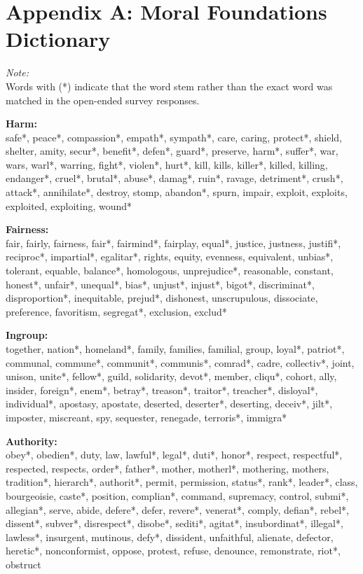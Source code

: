 \documentclass[12pt]{paper}
\begin{document}
\clearpage\flushleft\singlespace
\section*{Appendix A: Moral Foundations Dictionary \\\citep[c.f.][]{graham2009liberals}}

\textit{Note:}\\
Words with (*) indicate that the word stem rather than the exact word was matched in the open-ended survey responses.
\vspace{.5cm}

\textbf{Harm:}\\
safe*, peace*, compassion*, empath*, sympath*, care, caring, protect*, shield, shelter, amity, secur*, benefit*, defen*, guard*, preserve, harm*, suffer*, war, wars, warl*, warring, fight*, violen*, hurt*, kill, kills, killer*, killed, killing, endanger*, cruel*, brutal*, abuse*, damag*, ruin*, ravage, detriment*, crush*, attack*, annihilate*, destroy, stomp, abandon*, spurn, impair, exploit, exploits, exploited, exploiting, wound*
\vspace{.5cm}

\textbf{Fairness:}\\
fair, fairly, fairness, fair*, fairmind*, fairplay, equal*, justice, justness, justifi*, reciproc*, impartial*, egalitar*, rights, equity, evenness, equivalent, unbias*, tolerant, equable, balance*, homologous, unprejudice*, reasonable, constant, honest*, unfair*, unequal*, bias*, unjust*, injust*, bigot*, discriminat*, disproportion*, inequitable, prejud*, dishonest, unscrupulous, dissociate, preference, favoritism, segregat*, exclusion, exclud*
\vspace{.5cm}

\textbf{Ingroup:}\\
together, nation*, homeland*, family, families, familial, group, loyal*, patriot*, communal, commune*, communit*, communis*, comrad*, cadre, collectiv*, joint, unison, unite*, fellow*, guild, solidarity, devot*, member, cliqu*, cohort, ally, insider, foreign*, enem*, betray*, treason*, traitor*, treacher*, disloyal*, individual*, apostasy, apostate, deserted, deserter*, deserting, deceiv*, jilt*, imposter, miscreant, spy, sequester, renegade, terroris*, immigra*
\vspace{.5cm}

\textbf{Authority:}\\
obey*, obedien*, duty, law, lawful*, legal*, duti*, honor*, respect, respectful*, respected, respects, order*, father*, mother, motherl*, mothering, mothers, tradition*, hierarch*, authorit*, permit, permission, status*, rank*, leader*, class, bourgeoisie, caste*, position, complian*, command, supremacy, control, submi*, allegian*, serve, abide, defere*, defer, revere*, venerat*, comply, defian*, rebel*, dissent*, subver*, disrespect*, disobe*, sediti*, agitat*, insubordinat*, illegal*, lawless*, insurgent, mutinous, defy*, dissident, unfaithful, alienate, defector, heretic*, nonconformist, oppose, protest, refuse, denounce, remonstrate, riot*, obstruct
\vspace{.5cm}
\end{document}
